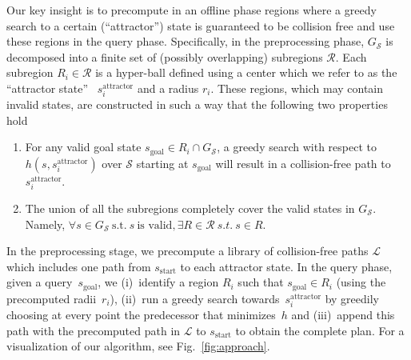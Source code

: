 \documentclass[letterpaper]{article} %
\newcommand{\calL}{\ensuremath{\mathcal{L}}\xspace}
\newcommand{\calS}{\ensuremath{\mathcal{S}}\xspace}
\newcommand{\calR}{\ensuremath{\mathcal{R}}\xspace}
\newcommand{\sAttract}{\ensuremath{s^{\text{attractor}}_i}\xspace}
\newcommand{\sStart}{\ensuremath{s_{\text{start}}\xspace}}
\newcommand{\sGoal}{\ensuremath{s_{\text{goal}}\xspace}}
\begin{document}
Our key insight is to precompute in an offline phase regions where a greedy search to a certain (``attractor'') state is guaranteed to be collision free and use these regions in the query phase.
Specifically, in the preprocessing phase, $G_\calS$ is decomposed into a finite  set of (possibly overlapping) subregions $\calR$.
Each subregion $R_i \in \calR$ is a hyper-ball defined using a center which we refer to as the ``attractor state''~
\sAttract and a radius $r_i$.
These regions, which may contain invalid states, are constructed in such a way that the following two properties hold
\begin{enumerate}[label={\textbf{P\arabic*}}]
  \item \label{property:1} For any valid goal state $s_{\text{goal}} \in R_i \cap G_\calS$, a greedy search with respect to $h(s, \sAttract)$ over $\calS$ starting at $\sGoal$ will result in a collision-free path to \sAttract.
  \item \label{property:2} The union of all the subregions completely cover the valid states in $G_\calS$. 
		  Namely, $\forall s \in G_\calS~\text{s.t.}~s~\text{is valid}, \exists R \in \calR \ s.t. \ s \in R$.
\end{enumerate}

In the preprocessing stage, we precompute a library of collision-free paths $\calL$ which includes one path from $\sStart$ to each attractor state. 
In the query phase, given a query~\sGoal, we 
(i)~identify a region $R_i$ such that $\sGoal \in R_i$ (using the precomputed radii~$r_i$),
(ii)~run a greedy search towards~\sAttract by greedily choosing at every point the predecessor that minimizes~$h$ and
(iii)~append this path with the precomputed path in $\calL$ to $\sStart$ to obtain the complete plan.
For a visualization of our algorithm, see Fig.~\ref{fig:approach}.
\end{document}
